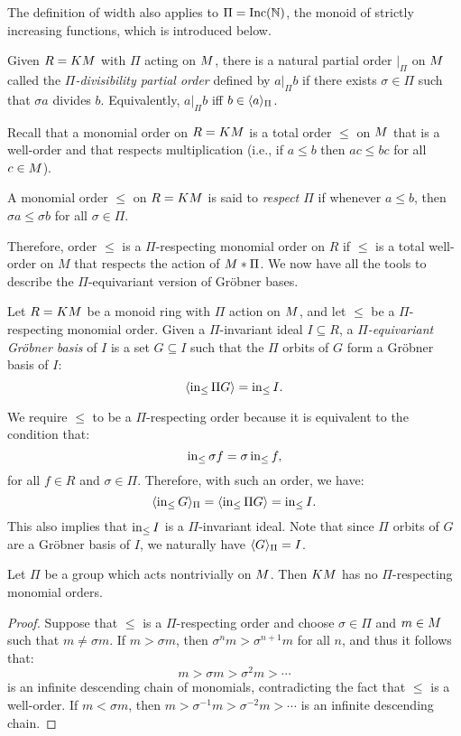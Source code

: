 The definition of width also applies to $\Pi = \operatorname{Inc}(\mathbb N)$, the monoid of strictly increasing functions, which is introduced below.
 
\begin{definition}
 Given $R = KM$ with $\Pi$ acting on $M$, there is a natural partial order $|_\Pi$ on $M$ called the {\em $\Pi$-divisibility partial order} defined by $a |_\Pi b$ if there exists $\sigma \in \Pi$ such that $\sigma a$ divides $b$.  Equivalently, $a |_\Pi b$ iff $b \in \langle a \rangle_\Pi$.
\end{definition}

Recall that a monomial order on $R = KM$ is a total order $\leq$ on $M$ that is a well-order and that respects multiplication (i.e., if $a \leq b$ then $ac \leq bc$ for all $c \in M$).

\begin{definition}
 A monomial order $\leq$ on $R = KM$ is said to {\em respect $\Pi$} if whenever $a \leq b$, then $\sigma a \leq \sigma b$ for all $\sigma \in \Pi$.
\end{definition}

Therefore, order $\leq$ is a $\Pi$-respecting monomial order on $R$ if $\leq$ is a total well-order on $M$ that respects the action of $M*\Pi$.
We now have all the tools to describe the $\Pi$-equivariant version of Gr\"obner bases.
\begin{definition}
 Let $R = KM$ be a monoid ring with $\Pi$ action on $M$, and let $\leq$ be a $\Pi$-respecting monomial order.  Given a $\Pi$-invariant ideal $I \subseteq R$, a {\em $\Pi$-equivariant Gr\"obner basis} of $I$ is a set $G \subseteq I$ such that the $\Pi$ orbits of $G$ form a Gr\"obner basis of $I$:
 \[ \langle \operatorname{in}_{\leq} \Pi G \rangle = \operatorname{in}_{\leq} I. \]
\end{definition}
We require $\leq$ to be a $\Pi$-respecting order because it is equivalent to the condition that:
\[ \operatorname{in}_{\leq} \sigma f = \sigma \operatorname{in}_{\leq} f,\]
for all $f \in R$ and $\sigma \in \Pi$.  Therefore, with such an order, we have:
 \[ \langle \operatorname{in}_{\leq} G \rangle_{\Pi} = \langle \operatorname{in}_{\leq} \Pi G \rangle = \operatorname{in}_{\leq} I. \]
This also implies that $\operatorname{in}_{\leq} I$ is a $\Pi$-invariant ideal.  Note that since $\Pi$ orbits of $G$ are a Gr\"obner basis of $I$, we naturally have $\langle G \rangle_\Pi = I$.


\begin{proposition}\label{prop:nogroup}
 Let $\Pi$ be a group which acts nontrivially on $M$.  Then $KM$ has no $\Pi$-respecting monomial orders.
\end{proposition}
\begin{proof}
 Suppose that $\leq$ is a $\Pi$-respecting order and choose $\sigma \in \Pi$ and $m \in M$ such that $m \neq \sigma m$.  If $m > \sigma m$, then $\sigma^n m > \sigma^{n+1} m$ for all $n$, and thus it follows that:
  \[ m > \sigma m > \sigma^2 m > \cdots \]
 is an infinite descending chain of monomials, contradicting the fact that $\leq$ is a well-order.  If $m < \sigma m$, then $m > \sigma^{-1} m > \sigma^{-2} m > \cdots$ is an infinite descending chain.
\end{proof}

